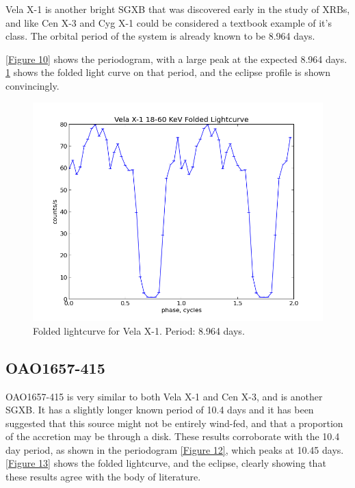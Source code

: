 Vela X-1 is another bright SGXB that was discovered early in the study of XRBs, and like Cen X-3 and Cyg X-1 could be considered a textbook example of it\textquoteright{}s class. The orbital period of the system is already known to be 8.964 days.

\ref{Figure 10} shows the periodogram, with a large peak at the expected 8.964 days. \ref{Figure 11} shows the folded light curve on that period, and the eclipse profile is shown convincingly. 

\begin{figure}[h!]
\centering
\includegraphics[width=130mm]{gfx/Fig11.png}
\caption{Folded lightcurve for Vela X-1. Period: 8.964 days.}
\label{Figure 11}
\end{figure} 

\subsection{OAO1657-415}
OAO1657-415 is very similar to both Vela X-1 and Cen X-3, and is another SGXB. It has a slightly longer known period of 10.4 days and it has been suggested that this source might not be entirely wind-fed, and that a proportion of the accretion may be through a disk. These results corroborate with the 10.4 day period, as shown in the periodogram \ref{Figure 12}, which peaks at 10.45 days. \ref{Figure 13} shows the folded lightcurve, and the eclipse, clearly showing that these results agree with the body of literature. 

